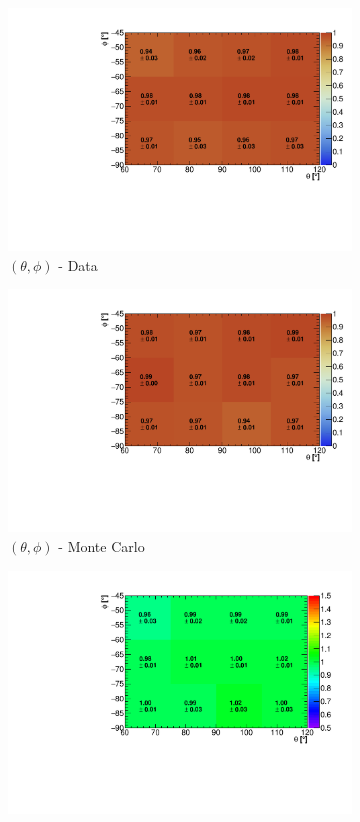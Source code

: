 \documentclass[a4paper,11pt]{article}
\begin{document}
\begin{figure}[htbp]
  \begin{subfigure}{0.33\textwidth}
    \includegraphics[width=\linewidth]{figures/e_theta_phi.pdf}
    \caption{$(\theta,\phi)$ - Data}
  \end{subfigure}\begin{subfigure}{0.33\textwidth}
  \includegraphics[width=\linewidth]{figures/theta_phi_mc.pdf}
  \caption{$(\theta,\phi)$ - Monte Carlo}
  \end{subfigure}\begin{subfigure}{0.33\textwidth}
  \includegraphics[width=\linewidth]{figures/theta_phi.pdf}

\end{subfigure}
\end{figure}
\end{document}

